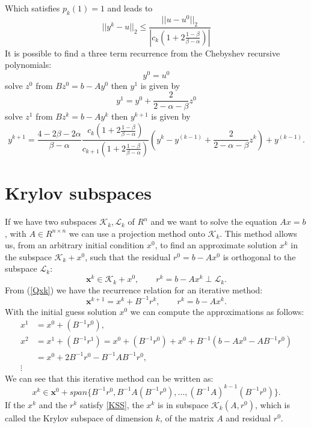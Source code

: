 \documentclass[12pt]{report}
\begin{document}
Which satisfies $p_k(1)=1$ and leads to
\begin{equation*}
||y^k-u||_2\leq \frac{||u-u^0||_2}{|c_k(1+2\frac{1-\beta}{\beta-\alpha})|}
\end{equation*}
It is possible to find a three term recurrence from the Chebyshev recursive polynomials:
\begin{equation*}
 y^0=u^0
\end{equation*}
solve $z^0$ from $Bz^0=b-Ay^0$ then $y^1$ is given by
\begin{equation*}
y^1=y^0+\frac{2}{2-\alpha-\beta}z^0
\end{equation*}
solve $z^1$ from $Bz^k=b-Ay^k$ then $y^{k+1}$ is given by
\begin{equation*}
y^{k+1}=\frac{4-2\beta-2\alpha}{\beta-\alpha}\frac{c_k(1+2\frac{1-\beta}{\beta-\alpha})}{c_{k+1}(1+2\frac{1-\beta}{\beta-\alpha})}(y^k-y^{(k-1)}+\frac{2}{2-\alpha-\beta}z^k)+y^{(k-1)}.
\end{equation*}


\section{Krylov subspaces}
If we have two subspaces $\mathcal{K}_k, \mathcal{L}_k$ of $R^n$ and we want to solve the equation $Ax=b$, with $A \in R^{n\times n}$ we can use a projection method onto $\mathcal{K}_k$.
This method allows us, from an arbitrary initial condition $x^0$, to find an approximate solution $x^k$ in the subspace $\mathcal{K}_k+x^0$,
such that the residual $r^0=b-Ax^0$ is orthogonal to the subspace $\mathcal{L}_k$:
\begin{equation}
\mathbf{x}^k \in \mathcal{K}_k+x^0, \qquad r^k=b-Ax^k \perp \mathcal{L}_k. \label{KSS}
\end{equation}
From (\ref{Qxk}) we have the recurrence relation for an iterative method:
\begin{equation*}
\mathbf{x}^{k+1}=x^k+B^{-1}r^k, \qquad r^k=b-Ax^k.
\end{equation*}
With the initial guess solution $x^0$ we can compute the approximations as follows:
\begin{align*}
x^1&=x^0+(B^{-1}r^0),\\
x^2&=x^1+(B^{-1}r^1)=x^0+(B^{-1}r^0)+x^0+B^{-1}(b-Ax^0-AB^{-1}r^0)\\
&=x^0+2B^{-1}r^0-B^{-1}AB^{-1}r^0,\\
\vdots
\end{align*}
We can see that this iterative method can be written as:
\begin{equation*}
x^k \in\mathbf{x}^0+span\{B^{-1}r^0,B^{-1}A(B^{-1}r^0),\dots,(B^{-1}A)^{k-1}(B^{-1}r^0)\}.
\end{equation*}
If the $x^k$ and the $r^k$ satisfy \eqref{KSS}, the $x^k$ is in subspace $\mathcal{K}_k(A,r^0)$, which is called the Krylov subspace of dimension $k$, of the matrix $A$ and residual $r^0$.\\
\end{document}
